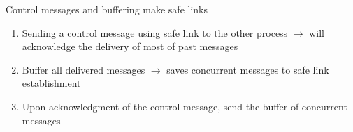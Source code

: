 \documentclass[10pt, xcolor={usenames, dvipsnames}]{beamer}
\begin{document}
\begin{frame}{Control messages and buffering make safe links}
  
  \begin{enumerate}
  \item Sending a control message using safe link to the other process
    $\rightarrow$ will acknowledge the delivery of most of past messages
  \item Buffer all delivered messages $\rightarrow$ saves concurrent messages to
    safe link establishment
  \item Upon acknowledgment of the control message, send the buffer of
    concurrent messages
  \end{enumerate}


  \begin{minipage}{0.32\textwidth}
    \vspace{4pt}
    \begin{center}
      
    \end{center}
  \end{minipage}
  \begin{minipage}{0.32\textwidth}
    \begin{center}
      
    \end{center}
  \end{minipage}
  \begin{minipage}{0.32\textwidth}
    \begin{center}
      
    \end{center}
  \end{minipage}
  
  \begin{center}
  \begin{minipage}{0.35\textwidth}
    \begin{center}
      
    \end{center}
  \end{minipage}
  \begin{minipage}{0.35\textwidth}
    \begin{center}
    \vspace{9pt}
      
    \end{center}
  \end{minipage}
  \end{center}    

\end{frame}
\end{document}
